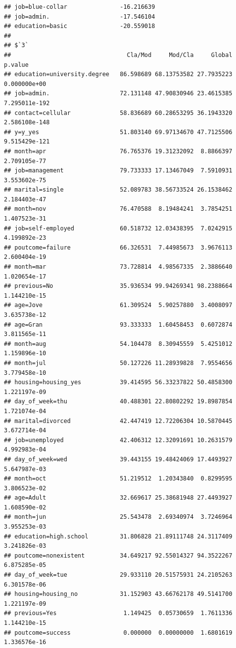 \documentclass[
]{article}
\begin{document}
\begin{verbatim}
## job=blue-collar               -16.216639
## job=admin.                    -17.546104
## education=basic               -20.559018
## 
## $`3`
##                                 Cla/Mod     Mod/Cla     Global       p.value
## education=university.degree   86.598689 68.13753582 27.7935223  0.000000e+00
## job=admin.                    72.131148 47.90830946 23.4615385 7.295011e-192
## contact=cellular              58.836689 60.28653295 36.1943320 2.586108e-148
## y=y_yes                       51.803140 69.97134670 47.7125506 9.515429e-121
## month=apr                     76.765376 19.31232092  8.8866397  2.709105e-77
## job=management                79.733333 17.13467049  7.5910931  3.553602e-75
## marital=single                52.089783 38.56733524 26.1538462  2.184403e-47
## month=nov                     76.470588  8.19484241  3.7854251  1.407523e-31
## job=self-employed             60.518732 12.03438395  7.0242915  4.199892e-23
## poutcome=failure              66.326531  7.44985673  3.9676113  2.600404e-19
## month=mar                     73.728814  4.98567335  2.3886640  1.020654e-17
## previous=No                   35.936534 99.94269341 98.2388664  1.144210e-15
## age=Jove                      61.309524  5.90257880  3.4008097  3.635738e-12
## age=Gran                      93.333333  1.60458453  0.6072874  3.811565e-11
## month=aug                     54.104478  8.30945559  5.4251012  1.159896e-10
## month=jul                     50.127226 11.28939828  7.9554656  3.779458e-10
## housing=housing_yes           39.414595 56.33237822 50.4858300  1.221197e-09
## day_of_week=thu               40.488301 22.80802292 19.8987854  1.721074e-04
## marital=divorced              42.447419 12.72206304 10.5870445  3.672714e-04
## job=unemployed                42.406312 12.32091691 10.2631579  4.992983e-04
## day_of_week=wed               39.443155 19.48424069 17.4493927  5.647987e-03
## month=oct                     51.219512  1.20343840  0.8299595  3.806523e-02
## age=Adult                     32.669617 25.38681948 27.4493927  1.608590e-02
## month=jun                     25.543478  2.69340974  3.7246964  3.955253e-03
## education=high.school         31.806828 21.89111748 24.3117409  3.241826e-03
## poutcome=nonexistent          34.649217 92.55014327 94.3522267  6.875285e-05
## day_of_week=tue               29.933110 20.51575931 24.2105263  6.301578e-06
## housing=housing_no            31.152903 43.66762178 49.5141700  1.221197e-09
## previous=Yes                   1.149425  0.05730659  1.7611336  1.144210e-15
## poutcome=success               0.000000  0.00000000  1.6801619  1.336576e-16

\end{verbatim}
\end{document}
